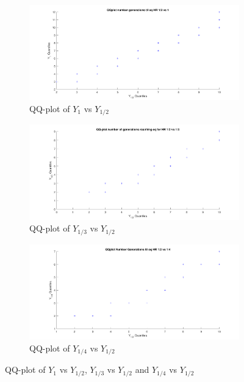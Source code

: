 \begin{figure}[H]
    \centering
    \begin{subfigure}{0.8\textwidth}
    \includegraphics[width=\textwidth]{QQplotATGEN3.pdf}
    \caption{QQ-plot of $Y_{1}$ vs $Y_{1/2}$}
        \label{fig:QQplotATGEN3}
    \end{subfigure}
    
    \begin{subfigure}{0.8\textwidth}
    \includegraphics[width=\textwidth]{QQplotATGEN1.pdf}
    \caption{QQ-plot of $Y_{1/3}$ vs $Y_{1/2}$}
        \label{fig:QQplotATGEN1}
    \end{subfigure}
    
    \begin{subfigure}{0.8\textwidth}
    \includegraphics[width=\textwidth]{QQplotATGEN2.pdf}
    \caption{QQ-plot of $Y_{1/4}$ vs $Y_{1/2}$}
        \label{fig:QQplotATGEN2}
    \end{subfigure}
    \caption{QQ-plot of $Y_{1}$ vs $Y_{1/2}$, $Y_{1/3}$ vs $Y_{1/2}$ and $Y_{1/4}$ vs $Y_{1/2}$}
    \label{fig:QQ-plot}
\end{figure}


